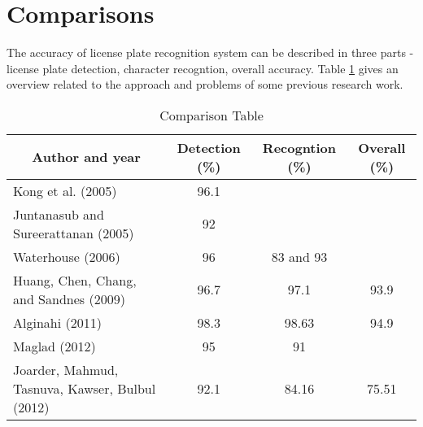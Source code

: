 \section{Comparisons}

The accuracy of license plate recognition system can be described in three parts - license plate detection, character recogntion, overall accuracy. Table \ref{tab:comparison} gives an overview related to the approach and problems of some previous research work.

\begin{table}[htb]
	\centering
	\begin{tabular}{|l|c|c|c|}
		\hline
		\multicolumn{1}{|c|}{Author and year}
		& \multicolumn{1}{|c|}{Detection (\%)}
		& \multicolumn{1}{|c|}{Recogntion (\%)} 
		& \multicolumn{1}{|c|}{Overall (\%)} \\ 
		\hline
		    
		Kong et al. (2005)\cite{Kong2005} & 96.1 &  & \\ \hline
		Juntanasub and Sureerattanan (2005) \cite{juntanasub2005car} & 92  &  & \\ \hline
		Waterhouse (2006)\cite{waterhouse-2006} & 96 & 83 and 93 & \\ \hline
		Huang, Chen, Chang, and Sandnes (2009)\cite{hsieh2009real} & 96.7 & 97.1  & 93.9 \\ \hline
		Alginahi (2011)\cite{alginahi2011automatic} & 98.3 & 98.63 & 94.9 \\ \hline
		Maglad (2012)\cite{maglad2012vehicle} & 95 & 91 & \\ \hline
		Joarder, Mahmud, Tasnuva, Kawser, Bulbul (2012)\cite{joarder2012bangla} & 92.1 & 84.16 & 75.51 \\ \hline
	\end{tabular}
	\caption{Comparison Table}
	\label{tab:comparison}
\end{table}



